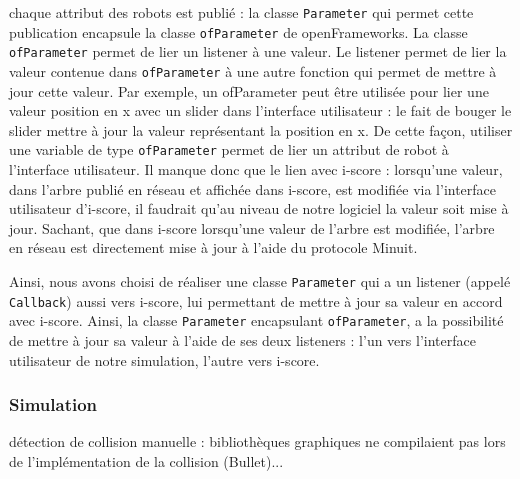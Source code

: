 chaque attribut des robots est publié : la classe \verb|Parameter| qui permet cette publication encapsule la classe \verb|ofParameter| de openFrameworks. La classe \verb|ofParameter| permet de lier un listener à une valeur. Le listener permet de lier la valeur contenue dans \verb|ofParameter| à une autre fonction qui permet de mettre à jour cette valeur. Par exemple, un ofParameter peut être utilisée pour lier une valeur position en x avec un slider dans l'interface utilisateur : le fait de bouger le slider mettre à jour la valeur représentant la position en x. De cette façon, utiliser une variable de type \verb|ofParameter| permet de lier un attribut de robot à l'interface utilisateur. 
Il manque donc que le lien avec i-score : lorsqu'une valeur, dans l'arbre publié en réseau et affichée dans i-score, est modifiée via l'interface utilisateur d'i-score, il faudrait qu'au niveau de notre logiciel la valeur soit mise à jour. Sachant, que dans i-score lorsqu'une valeur de l'arbre est modifiée, l'arbre en réseau est directement mise à jour à l'aide du protocole Minuit.

Ainsi, nous avons choisi de réaliser une classe \verb|Parameter| qui a un listener (appelé \verb|Callback|) aussi vers i-score, lui permettant de mettre à jour sa valeur en accord avec i-score. Ainsi, la classe \verb|Parameter| encapsulant \verb|ofParameter|, a la possibilité de mettre à jour sa valeur à l'aide de ses deux listeners : l'un vers l'interface utilisateur de notre simulation, l'autre vers i-score.


\subsubsection{Simulation}

détection de collision manuelle : bibliothèques graphiques ne compilaient pas lors de l'implémentation de la collision (Bullet)...

